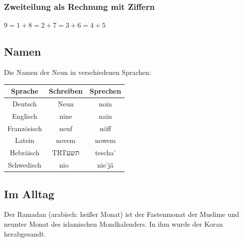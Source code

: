 \documentclass[a4paper]{amsart}
\newcommand{\texthebrew}[1]{\bgroup\textdir TRT\hebrewfont #1\egroup}
\theoremstyle{definition}
\begin{document}
\subsubsection{Zweiteilung als Rechnung mit Ziffern}
$9 = 1 + 8 = 2 + 7 = 3 + 6 = 4 + 5$

\subsection{Namen}
Die Namen der Neun in verschiedenen Sprachen:
\vspace{\kategoryVspace}

\begin{tabular}{|c|c|c|}
   \hline
   \textbf{Sprache}& \textbf{Schreiben} & \textbf{Sprechen} \\
   \hline
   Deutsch     &Neun   &noin      \\
   \hline
   Englisch    &nine   &nain      \\
   \hline
   Französisch &neuf   &nöff      \\
   \hline
   Latein      &novem  &nowem     \\
   \hline
   Hebräisch   &\texthebrew{תשע}    &tescha' \\
   \hline
   Schwedisch  &nio    &nie'jä     \\
   \hline
\end{tabular}

\subsection{Im Alltag}


Der Ramadan (arabisch: heißer Monat) ist der Fastenmonat der Muslime und neunter 
Monat des islamischen Mondkalenders. In ihm wurde der Koran herabgesandt.
\end{document}
